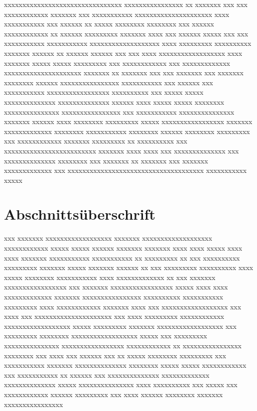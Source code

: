 xxxxxxxxxxxxxxxxxxxxxxxxxxxxxxxx xxxxxxxxxxxxxxxx xx xxxxxxx xxx xxx xxxxxxxxxxxx xxxxxxx xxx xxxxxxxxxxx xxxxxxxxxxxxxxxxxxxxx xxxx xxxxxxxxxxx xxx xxxxxx xx xxxxx xxxxxxxx xxxxxxxx xxx xxxxxx xxxxxxxxxxxx xx xxxxxx xxxxxxxxx xxxxxxx xxxx xxx xxxxxx xxxxx xxx xxx xxxxxxxxxxx xxxxxxxxxxx xxxxxxxxxxxxxxxxxxx xxxx xxxxxxxxx xxxxxxxxxx xxxxxxx xxxxxx xx xxxxxx xxxxxx xxx xxx xxxx xxxxxxxxxxxxxxxxxx xxxx xxxxxxx xxxxx xxxxx xxxxxxxxx xxx xxxxxxxxxxxx xxx xxxxxxxxxxxxx xxxxxxxxxxxxxxxxxxxxx xxxxxxx xx xxxxxxx xxx xxx xxxxxxx xxx xxxxxxx xxxxxxxx xxxxxx xxxxxxxxxxxxxxxx xxxxxxxxxxx xxx xxxxxx xxx xxxxxxxxxxx xxxxxxxxxxxxxxxxx xxxxxxxxxx xxx xxxxx xxxxx xxxxxxxxxxxxxx xxxxxxxxxxxxxx xxxxxx xxxx xxxxx xxxxx xxxxxxxx xxxxxxxxxxxxxxx xxxxxxxxxxxxxxxx xxx xxxxxxxxxxx xxxxxxxxxxxxxxx xxxxxxx xxxxxx xxxx xxxxxxxx xxxxxxxxx xxxxx xxxxxxxxxxxxxxxxx xxxxxxx xxxxxxxxxxxxx xxxxxxxx xxxxxxxxxxx xxxxxxxx xxxxxx xxxxxxxx xxxxxxxxx xxx xxxxxxxxxxxx xxxxxxx xxxxxxxxx xx xxxxxxxxxx xxx xxxxxxxxxxxxxxxxxxxxxxxxx xxxxxxx xxxx xxxx xxx xxxxxxxxxxxxxx xxx xxxxxxxxxxxxxx xxxxxxxx xxx xxxxxxx xx xxxxxxx xxx xxxxxxx xxxxxxxxxxxxx xxx xxxxxxxxxxxxxxxxxxxxxxxxxxxxxxxxxxxxx xxxxxxxxxxx xxxxx
\section{Abschnittsüberschrift}\label{sec:xxxxxxx}
xxx xxxxxxx xxxxxxxxxxxxxxxxxx xxxxxxx xxxxxxxxxxxxxxxxxxx xxxxxxxxxxxx xxxxx xxxxx xxxxxx xxxxxxx xxxxxxx xxxx xxxx xxxxx xxxx xxxx xxxxxxx xxxxxxxxxxx xxxxxxxxxxx xx xxxxxxxxx xx xxx xxxxxxxxxx xxxxxxxxx xxxxxxx xxxxx xxxxxxx xxxxxx xx xxx xxxxxxxxx xxxxxxxxxx xxxx xxxxx xxxxxxxx xxxxxxxxxxx xxxx xxxxxxxxxxxxx xx xxx xxxxxxx xxxxxxxxxxxxxxxxx xxx xxxxxxx xxxxxxxxxxxxxxxxx xxxxx xxxx xxxx xxxxxxxxxxxxx xxxxxxx xxxxxxxxxxxxxxxx xxxxxxxxxx xxxxxxxxxxx xxxxxxxxx xxxx xxxxxxxxxxxx xxxxxxx xxxx xxx xxxxxxxxxxxxxxxxxx xxx xxxx xxx xxxxxxxxxxxxxxxxxxxxx xxx xxxx xxxxxxxxx xxxxxxxxxxxx xxxxxxxxxxxxxxxxxx xxxxx xxxxxxxxx xxxxxxx xxxxxxxxxxxxxxxxxx xxx xxxxxxxxx xxxxxxxx xxxxxxxxxxxxxxxxxx xxxxx xxx xxxxxxxxx xxxxxxxxxxxxxxx xxxxxxxxxxxxxxxxx xxxxxxxxxxxx xx xxxxxxxxxxxxxxxx xxxxxxxx xxx xxxx xxx xxxxxx xxx xx xxxxx xxxxxxxx xxxxxxxxx xxx xxxxxxxxxxx xxxxxxx xxxxxxxxxxxxxx xxxxxxxx xxxxx xxxxx xxxxxxxxxxxx xxx xxxxxxxxxxx xx xxxxxx xxx xxxxxxxxxxxxxx xxxxxxxxxxxxx xxxxxxxxxxxxxx xxxxx xxxxxxxxxxxxxxx xxxx xxxxxxxxxx xxx xxxxx xxx xxxxxxxxxxxx xxxxxx xxxxxxxxx xxx xxxx xxxxxx xxxxxxxx xxxxxxx xxxxxxxxxxxxxxxx

